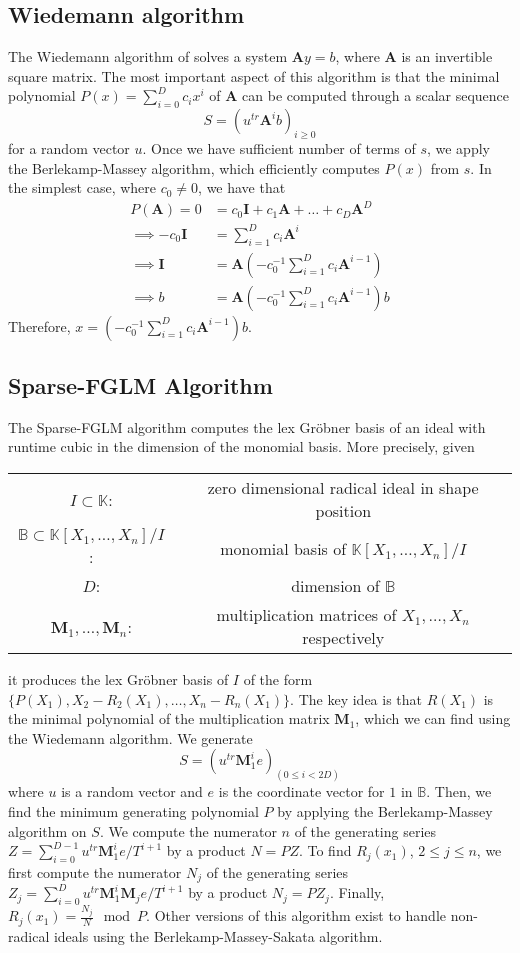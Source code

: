 \documentclass[12pt]{article}
\def\mA{\mathbf{A}}
\def\mI{\mathbf{I}}
\def\mM{\mathbf{M}}
\begin{document}
\subsection{Wiedemann algorithm}
The Wiedemann algorithm of \cite{Wiedemann86} solves a system
$\mA y = b$, where $\mA$ is an invertible square matrix. The most
important aspect of this algorithm is that the minimal polynomial
$P(x) = \sum_{i = 0}^{D} c_i x^i$ of $\mA$ can be computed
through a scalar sequence
$$ S = (u^{tr}\mA^ib)_{i \ge 0}$$
for a random vector $u$. Once we have sufficient number of terms
of $s$, we apply the Berlekamp-Massey algorithm, which efficiently
computes $P(x)$ from $s$.
In the simplest case, where $c_0 \neq 0$, we have that
\begin{align*}
P(\mA) = 0 &= c_0 \mI + c_1\mA + \dots + c_D \mA^D \\
\implies -c_0 \mI &= \sum_{i=1}^{D}c_i\mA^i \\
\implies \mI &= \mA(-c_0^{-1} \sum_{i=1}^{D}c_i\mA^{i-1})\\
\implies b &= \mA(-c_0^{-1} \sum_{i=1}^{D}c_i\mA^{i-1})b
\end{align*}
Therefore, $x = (-c_0^{-1} \sum_{i=1}^{D}c_i\mA^{i-1})b$.

\subsection{Sparse-FGLM Algorithm}
The Sparse-FGLM algorithm \cite{FaMo17} computes the lex
Gr\"obner basis of an ideal with runtime cubic in the dimension
of the monomial basis. More precisely, given

\begin{center}
\begin{tabular}{c c}
	$I \subset \mathbb{K}$:& zero dimensional radical ideal
	in shape position\\
	$\mathbb{B} \subset \mathbb{K}[X_1,\dots,X_n]/I$:&
	monomial basis of $\mathbb{K}[X_1,\dots,X_n]/I$\\
	$D$: & dimension of $\mathbb{B}$\\
	$\mM_1,\dots,\mM_n$:& multiplication matrices of
	$X_1,\dots,X_n$ respectively	
\end{tabular}
\end{center}
it produces the lex Gr\"obner basis of $I$ of the form
$\{ P(X_1), X_2-R_2(X_1),\dots, X_n - R_n(X_1)  \}$.
The key idea is that $R(X_1)$ is the minimal polynomial
of the multiplication matrix $\mM_1$, which we can
find using the Wiedemann algorithm. We generate
$$ S = (u^{tr} \mM^i_1 e)_{(0 \le i < 2D)}$$
where $u$ is a random vector and $e$ is the coordinate
vector for $1$ in $\mathbb{B}$. Then, we find the minimum
generating polynomial $P$ by
applying the Berlekamp-Massey algorithm on $S$.
We compute the numerator $n$ of the generating series
$Z = \sum_{i=0}^{D-1} u^{tr} \mM^i_1 e/T^{i+1}$ by a product
$N = P Z$. To find $R_j(x_1)$, $2 \le j \le n$, we first
compute the numerator $N_j$ of the generating series
$Z_j = \sum_{i=0}^{D} u^{tr} \mM_1^i \mM_j e / T^{i+1}$ by a product
$N_j = P Z_j$. Finally, $R_j(x_1) = \frac{N_j}{N} \mod P$.
Other versions of this algorithm exist to handle
non-radical ideals using the Berlekamp-Massey-Sakata algorithm.
\end{document}
